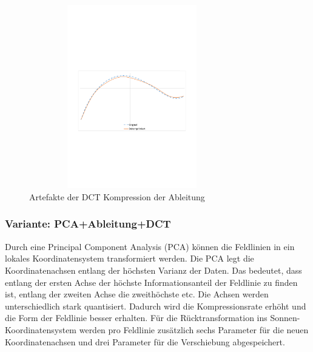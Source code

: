 \begin{figure}[!htbp]
	\center
	\includegraphics[trim = 1.8cm 9.5cm 1.8cm 11cm, clip=true,width=0.8\textwidth,height=8cm,keepaspectratio]{./pictures/resultate/loesung1/loesung1-6/artefakte.pdf}
	\caption{Artefakte der DCT Kompression der Ableitung}
	\label{resultate:loesung1:dct:byte:artefakte}
\end{figure} 

\subsubsection{Variante: PCA+Ableitung+DCT}
Durch eine Principal Component Analysis (PCA) \cite{abdi2010principal} können die Feldlinien in ein lokales Koordinatensystem transformiert werden. Die PCA legt die Koordinatenachsen entlang der höchsten Varianz der Daten. Das bedeutet, dass entlang der ersten Achse der höchste Informationsanteil der Feldlinie zu finden ist, entlang der zweiten Achse die zweithöchste etc. Die Achsen werden unterschiedlich stark quantisiert. Dadurch wird die Kompressionsrate erhöht und die Form der Feldlinie besser erhalten. Für die Rücktransformation ins Sonnen-Koordinatensystem werden pro Feldlinie zusätzlich sechs Parameter für die neuen Koordinatenachsen und drei Parameter für die Verschiebung abgespeichert.

